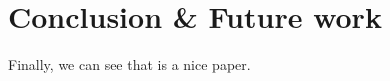 
\section{Conclusion \& Future work}\label{sec:Conclusion}

Finally, we can see that \cite{liuWang2013:agentTypesHLPE} is a nice paper.
